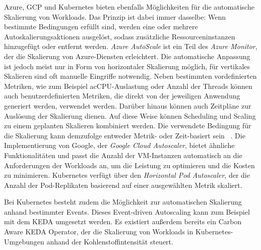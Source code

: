 Azure, \ac{GCP} und Kubernetes bieten ebenfalls Möglichkeiten für die automatische Skalierung von Workloads.
Das Prinzip ist dabei immer dasselbe:
Wenn bestimmte Bedingungen erfüllt sind, werden eine oder mehrere Autoskalierungsaktionen ausgelöst, sodass zusätzliche Ressourceninstanzen hinzugefügt oder entfernt werden.
\textit{Azure AutoScale} ist ein Teil des \textit{Azure Monitor}, der die Skalierung von Azure-Diensten erleichtert.
Die automatische Anpassung ist jedoch meist nur in Form von horizontaler Skalierung möglich, für vertikales Skalieren sind oft manuelle Eingriffe notwendig.
Neben bestimmten vordefinierten Metriken, wie zum Beispiel ac{CPU}-Auslastung oder Anzahl der Threads können auch benutzerdefinierten Metriken, die direkt von der jeweiligen Anwendung generiert werden, verwendet werden.
Darüber hinaus können auch Zeitpläne zur Auslösung der Skalierung dienen.
Auf diese Weise können Scheduling und Scaling zu einem geplanten Skalieren kombiniert werden.
Die verwendete Bedingung für die Skalierung kann demzufolge entweder Metrik- oder Zeit-basiert sein ~\cite{Microsoft.2023}.
Die Implementierung von Google, der \textit{Google Cloud Autoscaler}, bietet ähnliche Funktionalitäten und passt die Anzahl der \ac{VM}-Instanzen automatisch an die Anforderungen der Workloads an, um die Leistung zu optimieren und die Kosten zu minimieren.
Kubernetes verfügt über den \textit{Horizontal Pod Autoscaler}, der die Anzahl der Pod-Replikaten basierend auf einer ausgewählten Metrik skaliert.

Bei Kubernetes besteht zudem die Möglichkeit zur automatischen Skalierung anhand bestimmter Events.
Dieses Event-driven Autoscaling kann zum Beispiel mit dem \ac{KEDA} umgesetzt werden.
Es existiert außerdem bereits ein Carbon Aware \ac{KEDA} Operator, der die Skalierung von Workloads in Kubernetes-Umgebungen anhand der Kohlenstoffintensität steuert.

